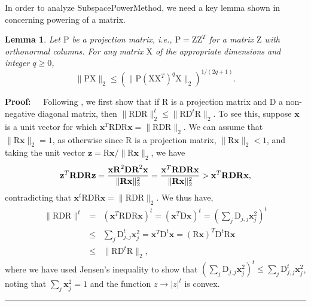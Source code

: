 \documentclass[11pt]{article}
\newtheorem{lemma}[theorem]{Lemma}
\newenvironment{proof}{\begin{trivlist} \item {\bf Proof:~~}}
  {\qed\end{trivlist}}
\newcommand{\mat}[1]{{\ensuremath{\bm{\mathrm{#1}}}}}
\def\matD{\mat{D}}
\def\matP{\mat{P}}
\def\matR{\mat{R}}
\def\matX{\mat{X}}
\def\matZ{\mat{Z}}
\def\frac#1#2{{#1\over #2}}
\def\qed{\hfill\rule{2mm}{2mm}}
\def\x{{\mathbf x}}
\def\z{{\mathbf z}}
\begin{document}
In order to analyze {\sf SubspacePowerMethod}, we need a key lemma shown in \cite{HMT} concerning powering of a matrix.
\begin{lemma}\label{lem:tropp}
Let $\matP$ be a projection matrix, i.e., $\matP = \matZ\matZ^T$ for a matrix $\matZ$ with orthonormal columns. For any matrix $\matX$ of
the appropriate dimensions and integer $q \geq 0$,
$$\|\matP\matX\|_2 \leq (\|\matP(\matX\matX^T)^q\matX\|_2)^{1/(2q+1)}.$$
\end{lemma}
\begin{proof}
Following \cite{HMT}, we first show that if $\matR$ is a projection matrix and $\matD$ a non-negative diagonal matrix,
then $\|\matR\matD\matR\|_2^t \leq \|\matR\matD^t\matR\|_2$. To see this, suppose $\x$ is a unit vector for which
$\x^T\matR\matD\matR\x = \|\matR\matD\matR\|_2$. We can assume that $\|\matR\x\|_2 = 1$, as otherwise since $\matR$ is a projection matrix,
$\|\matR\x\|_2 < 1$, and taking the unit vector $\z = \matR\x/\|\matR\x\|_2$, we have
$$\z^T \matR \matD\matR \z = \frac{\x\matR^2 \matD \matR^2 \x}{\|\matR\x\|_2^2} = \frac{\x^T\matR\matD\matR\x}{\|\matR\x\|_2^2} > \x^T\matR\matD\matR\x,$$
contradicting that $\x^t\matR\matD\matR\x = \|\matR\matD\matR\|_2$. We thus have,
\begin{eqnarray*}
\|\matR\matD\matR\|^t & = & (\x^T \matR\matD\matR \x)^t = (\x^T\matD\x)^t = (\sum_j \matD_{j,j} \x_j^2)^t\\
& \leq & \sum_j \matD_{j,j}^t \x_j^2 = \x^T \matD^t \x = (\matR\x)^T \matD^t \matR\x\\
& \leq & \|\matR\matD^t \matR\|_2,
\end{eqnarray*}
where we have used Jensen's inequality to show that $(\sum_j \matD_{j,j} \x_j^2)^t \leq \sum_j \matD_{j,j}^t \x_j^2$, noting
that $\sum_j \x_j^2 = 1$ and the function $z \rightarrow |z|^t$ is convex.


\end{proof}
\end{document}
